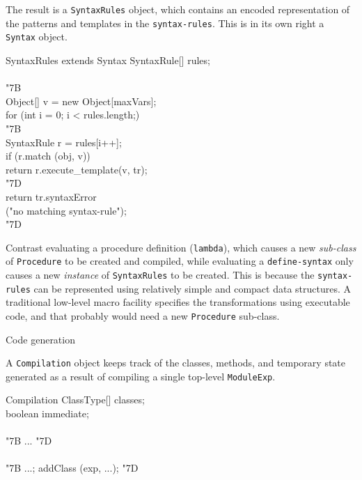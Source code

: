 \documentclass[twocolumn]{article}
\makeatletter
\def\section{\@startsection {section}{1}{\z@}
   {14pt plus 2pt minus 2pt}{12pt plus 2pt minus 2pt} {\large\bf}}
\newcommand{\LBr}{\char"7B}
\newcommand{\RBr}{\char"7D}
\newcommand{\Tab}{\>}
\makeatother
\begin{document}
The result is a {\tt SyntaxRules} object, which contains an encoded
representation of the patterns and templates in the {\tt syntax-rules}.
This is in its own right a {\tt Syntax} object.

\begin{Class}{SyntaxRules}{ extends Syntax}
SyntaxRule[] rules;\\
\\
\LBr\+\\
    Object[] v = new Object[maxVars];\\
    for (int i = 0;  i < rules.length;)\\
      \LBr\+\\
        SyntaxRule r = rules[i++];\\
        if (r.match (obj, v))\\
        \Tab return r.execute\_template(v, tr);\-\\
      \RBr\\
    return tr.syntaxError\\
    \Tab ("no matching syntax-rule");\-\\
\RBr\\
\end{Class}

Contrast evaluating a procedure definition ({\tt lambda}), which
causes a new \emph{sub-class} of {\tt Procedure} to be created and compiled,
while evaluating a {\tt define-syntax} only causes a new \emph{instance}
of {\tt SyntaxRules} to be created.  This is because the {\tt syntax-rules}
can be represented using relatively simple and compact data structures.
A traditional low-level macro facility specifies the transformations using
executable code, and that probably would need a new
{\tt Procedure} sub-class.

\section{Code generation}

A {\tt Compilation} object keeps track of the classes, methods, and
temporary state generated as a result of compiling a
single top-level {\tt ModuleExp}.

\begin{Class}{Compilation}{}
ClassType[] classes;\\
boolean immediate;\\
\\
{\LBr} ... {\RBr}\\
\\
{\LBr} ...; addClass (exp, ...); {\RBr}\\
\end{Class}
\end{document}
